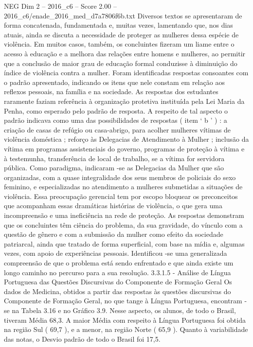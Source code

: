 \begin{textsample}{NEG Dim 2 – 2016\_c6 – Score 2.00 – 2016\_c6/enade\_2016\_med\_d7a7806f6b.txt}
Diversos textos se apresentaram de forma concatenada, fundamentada e, muitas vezes, lamentando que, nos dias atuais, ainda se discuta a necessidade de proteger as mulheres dessa espécie de violência.
Em muitos casos, também, os concluintes fizeram um liame entre o acesso à educação e a melhora das relações entre homens e mulheres, ao permitir que a conclusão de maior grau de educação formal conduzisse à diminuição do índice de violência contra a mulher.
Foram identificadas respostas consoantes com o padrão apresentado, indicando os itens que nele constam em relação aos reflexos pessoais, na família e na sociedade.
As respostas dos estudantes raramente faziam referência à organização protetiva instituída pela Lei Maria da Penha, como esperado pelo padrão de resposta.
A respeito de tal aspecto o padrão indicava como uma das possibilidades de respostas ( item ‘ b ’ ) : a criação de casas de refúgio ou casa-abrigo, para acolher mulheres vítimas de violência doméstica ; reforço às Delegacias de Atendimento à Mulher ; inclusão da vítima em programas assistenciais do governo, programas de proteção à vítima e à testemunha, transferência de local de trabalho, se a vítima for servidora pública.
Como paradigma, indicaram -se as Delegacias da Mulher que são organizadas, com a quase integralidade dos seus membros de policiais do sexo feminino, e especializadas no atendimento a mulheres submetidas a situações de violência.
Essa preocupação gerencial tem por escopo bloquear os preconceitos que acompanham essas dramáticas histórias de violência, o que gera uma incompreensão e uma ineficiência na rede de proteção.
As respostas demonstram que os concluintes têm ciência do problema, da sua gravidade, do vínculo com a questão de gênero e com a submissão da mulher como efeito da sociedade patriarcal, ainda que tratado de forma superficial, com base na mídia e, algumas vezes, com apoio de experiências pessoais.
Identificou -se uma generalizada compreensão de que o problema está sendo enfrentado e que ainda existe um longo caminho no percurso para a sua resolução. 3.3.1.5 - Análise de Língua Portuguesa das Questões Discursivas do Componente de Formação Geral Os dados de Medicina, obtidos a partir das respostas às questões discursivas do Componente de Formação Geral, no que tange à Língua Portuguesa, encontram -se na Tabela 3.16 e no Gráfico 3.9.
Nesse aspecto, os alunos, de todo o Brasil, tiveram Média 68,3.
A maior Média com respeito à Língua Portuguesa foi obtida na região Sul ( 69,7 ), e a menor, na região Norte ( 65,9 ).
Quanto à variabilidade das notas, o Desvio padrão de todo o Brasil foi 17,5.

\end{textsample}
